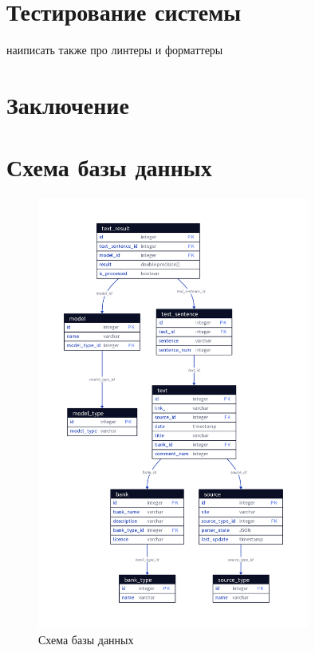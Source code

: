 \documentclass[PI, VKR]{HSEUniversity}
\begin{document}
\chapter{Тестирование системы}
\label{sec:orgf4e2cf6}
наиписать также про линтеры и форматтеры
\chapter*{Заключение}
\label{sec:org56a2f50}
\putbibliography
\appendix

\chapter{Схема базы данных}
\label{sec:org48c235f}
\begin{figure}[h!]
\centering
\includegraphics[width=0.8\textwidth]{img/d2/database.png}
\caption{\label{fig:database}Схема базы данных}
\end{figure}
\end{document}
